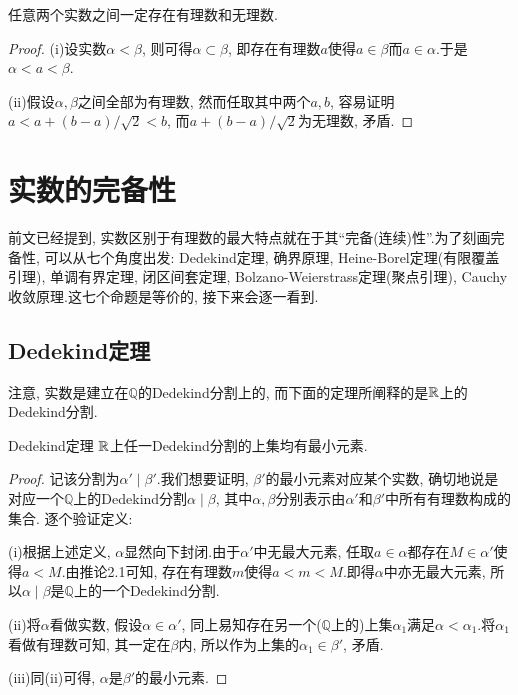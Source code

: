 \begin{corollary}{}
	任意两个实数之间一定存在有理数和无理数.
\end{corollary}
\begin{proof}
	(i)设实数$\alpha < \beta$, 则可得$\alpha \subset \beta$, 即存在有理数$a$使得$a \in \beta$而$a \in \alpha$.于是$\alpha < a < \beta$. 
	
	(ii)假设$\alpha , \beta$之间全部为有理数, 然而任取其中两个$a, b$, 容易证明$a<a+(b-a)/\sqrt{2}<b$, 而$a+(b-a)/\sqrt{2}$为无理数, 矛盾.
\end{proof}



\newpage
\section{实数的完备性}

前文已经提到, 实数区别于有理数的最大特点就在于其“完备(连续)性”.为了刻画完备性, 可以从七个角度出发: Dedekind定理, 确界原理, Heine-Borel定理(有限覆盖引理), 单调有界定理, 闭区间套定理, Bolzano-Weierstrass定理(聚点引理), Cauchy收敛原理.这七个命题是等价的, 接下来会逐一看到.

\subsection{Dedekind定理}

注意, 实数是建立在$\mathbb{Q}$的Dedekind分割上的, 而下面的定理所阐释的是$\mathbb{R}$上的Dedekind分割.

\begin{theorem}{Dedekind定理}
	$\mathbb{R}$上任一Dedekind分割的上集均有最小元素.
\end{theorem}
\begin{proof}
	记该分割为$\alpha ' \mid \beta '$.我们想要证明, $\beta '$的最小元素对应某个实数, 确切地说是对应一个$\mathbb{Q}$上的Dedekind分割$\alpha \mid \beta$, 其中$\alpha , \beta$分别表示由$\alpha '$和$\beta '$中所有有理数构成的集合. 逐个验证定义: 
	
	(i)根据上述定义, $\alpha$显然向下封闭.由于$\alpha '$中无最大元素, 任取$a \in \alpha$都存在$M \in \alpha '$使得$a < M$.由推论2.1可知, 存在有理数$m$使得$a<m<M$.即得$\alpha$中亦无最大元素, 所以$\alpha \mid \beta$是$\mathbb{Q}$上的一个Dedekind分割. 
	
	(ii)将$\alpha$看做实数, 假设$\alpha \in \alpha '$, 同上易知存在另一个($\mathbb{Q}$上的)上集$\alpha _1$满足$\alpha < \alpha _1$.将$\alpha _1$看做有理数可知, 其一定在$\beta$内, 所以作为上集的$\alpha _1 \in \beta '$, 矛盾. 
	
	(iii)同(ii)可得, $\alpha$是$\beta '$的最小元素.
\end{proof}

